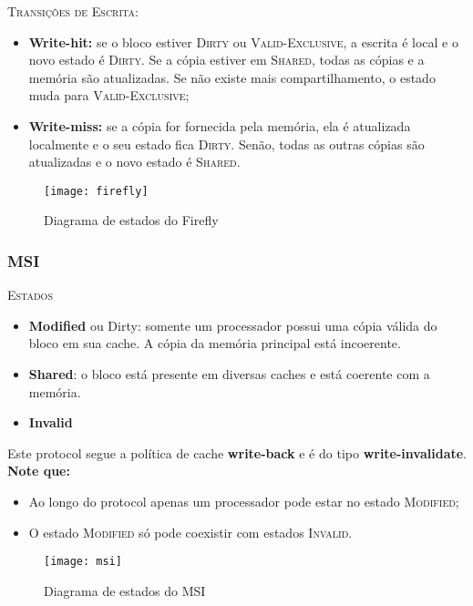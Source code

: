 \textsc{Transições de Escrita:}
\begin{itemize}
  \item \textbf{Write-hit:} se o bloco estiver \textsc{Dirty} ou \textsc{Valid-Exclusive}, a escrita é local e o novo estado é \textsc{Dirty}. Se a cópia estiver em \textsc{Shared}, todas as cópias e a memória são atualizadas. Se não existe mais compartilhamento, o estado muda para \textsc{Valid-Exclusive};

  \item \textbf{Write-miss:} se a cópia for fornecida pela memória, ela é atualizada localmente e o seu estado fica \textsc{Dirty}. Senão, todas as outras cópias são atualizadas e o novo estado é \textsc{Shared}.
\end{itemize}

\begin{figure}[ht]
  \centering
  \texttt{[image: firefly]}
  \label{fig:firefly-automata}
  \caption{Diagrama de estados do Firefly}
\end{figure}


\subsubsection{MSI}
\textsc{Estados}\\
\begin{itemize}
  \item \textbf{Modified} ou Dirty: somente um processador possui uma cópia válida do bloco em sua cache. A cópia da memória principal está incoerente.
  \item \textbf{Shared}: o bloco está presente em diversas caches e está coerente com a memória.
  \item \textbf{Invalid}
\end{itemize}

Este protocol segue a política de cache \textbf{write-back} e é do tipo \textbf{write-invalidate}. \textbf{Note que:}
\begin{itemize}
  \item Ao longo do protocol apenas um processador pode estar no estado \textsc{Modified};

  \item O estado \textsc{Modified} só pode coexistir com estados \textsc{Invalid}.
\end{itemize}

\begin{figure}[ht]
  \centering
  \texttt{[image: msi]}
  \label{fig:msi-automata}
  \caption{Diagrama de estados do MSI}
\end{figure}



